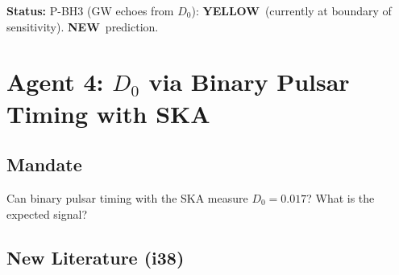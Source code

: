 \documentclass[11pt,a4paper]{article}
\newcommand{\YELLOW}{\textcolor{dfdyellow}{\textbf{YELLOW}}}
\newcommand{\NEW}{\textcolor{dfdblue}{\textbf{NEW}}}
\begin{document}
\textbf{Status:} P-BH3 (GW echoes from $D_0$): \YELLOW\ (currently at boundary of sensitivity). \NEW\ prediction.


\newpage
\section{Agent 4: $D_0$ via Binary Pulsar Timing with SKA}
\label{sec:agent4}

\subsection{Mandate}

Can binary pulsar timing with the SKA measure $D_0 = 0.017$? What is the expected signal?

\subsection{New Literature (i38)}
\end{document}
